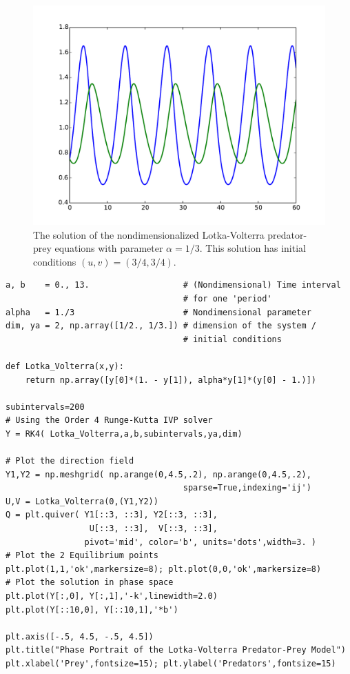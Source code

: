 \begin{figure}[ht]
\centering
\includegraphics[width=\textwidth]{Lotka_Volterra.pdf}
\caption{The solution of the nondimensionalized Lotka-Volterra 
predator-prey equations with parameter $\alpha = 1/3$. 
This solution has initial conditions $(u,v) = (3/4, 3/4)$. }
\label{pred-prey:Lotka_Voterra}
\end{figure}


\begin{lstlisting}
a, b 	= 0., 13. 					# (Nondimensional) Time interval 
									# for one 'period' 
alpha 	= 1./3              		# Nondimensional parameter
dim, ya = 2, np.array([1/2., 1/3.]) # dimension of the system / 
									# initial conditions

def Lotka_Volterra(x,y):
	return np.array([y[0]*(1. - y[1]), alpha*y[1]*(y[0] - 1.)])

subintervals=200
# Using the Order 4 Runge-Kutta IVP solver
Y = RK4( Lotka_Volterra,a,b,subintervals,ya,dim)

# Plot the direction field
Y1,Y2 = np.meshgrid( np.arange(0,4.5,.2), np.arange(0,4.5,.2),
									sparse=True,indexing='ij')
U,V = Lotka_Volterra(0,(Y1,Y2))
Q = plt.quiver( Y1[::3, ::3], Y2[::3, ::3], 
				 U[::3, ::3],  V[::3, ::3],
            	pivot='mid', color='b', units='dots',width=3. )
# Plot the 2 Equilibrium points
plt.plot(1,1,'ok',markersize=8); plt.plot(0,0,'ok',markersize=8) 
# Plot the solution in phase space
plt.plot(Y[:,0], Y[:,1],'-k',linewidth=2.0)
plt.plot(Y[::10,0], Y[::10,1],'*b')

plt.axis([-.5, 4.5, -.5, 4.5])
plt.title("Phase Portrait of the Lotka-Volterra Predator-Prey Model")
plt.xlabel('Prey',fontsize=15); plt.ylabel('Predators',fontsize=15)
\end{lstlisting}


